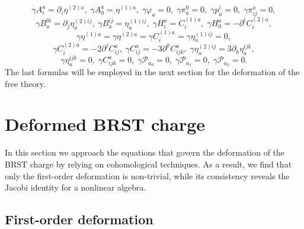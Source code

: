 \documentclass[a4paper,12pt]{article}
\begin{document}
\begin{equation}
\gamma A_{i}^{a}=\partial _{i}\eta ^{(2)a},\;\gamma A_{0}^{a}=\eta
^{(1)a},\;\gamma \varphi _{a}=0,\;\gamma \pi _{a}^{0}=0,\;\gamma
p_{a}^{i}=0,\;\gamma \pi _{ij}^{a}=0,  \label{xx34}
\end{equation}
\begin{equation}
\gamma B_{a}^{0i}=\partial _{j}\eta _{a}^{(2)ij},\;\gamma B_{a}^{ij}=\eta
_{a}^{(1)ij},\;\gamma H_{i}^{a}=C_{i}^{(1)a},\;\gamma H_{0}^{a}=-\partial
^{i}C_{i}^{(2)a},  \label{xx35}
\end{equation}
\begin{equation}
\gamma \eta ^{(1)a}=\gamma \eta ^{(2)a}=\gamma C_{i}^{(1)a}=\gamma \eta
_{a}^{(1)ij}=0,  \label{xx36}
\end{equation}
\begin{equation}
\gamma C_{i}^{(2)a}=-2\partial ^{j}C_{ij}^{a},\;\gamma C_{ij}^{a}=-3\partial
^{k}C_{ijk}^{a},\;\gamma \eta _{a}^{(2)ij}=3\partial _{k}\eta _{a}^{ijk},
\label{xx37}
\end{equation}
\begin{equation}
\gamma \eta _{a}^{ijk}=0,\;\gamma C_{ijk}^{a}=0,\;\gamma \mathcal{P}%
_{a_{0}}=0,\;\gamma \mathcal{P}_{a_{1}}=0,\;\gamma \mathcal{P}_{a_{2}}=0.
\label{xx38}
\end{equation}
The last formulas will be employed in the next section for the deformation
of the free theory.

\section{Deformed BRST charge}

In this section we approach the equations that govern the deformation of the
BRST charge by relying on cohomological techniques. As a result, we find
that only the first-order deformation is non-trivial, while its consistency
reveals the Jacobi identity for a nonlinear algebra.

\subsection{First-order deformation}
\end{document}
